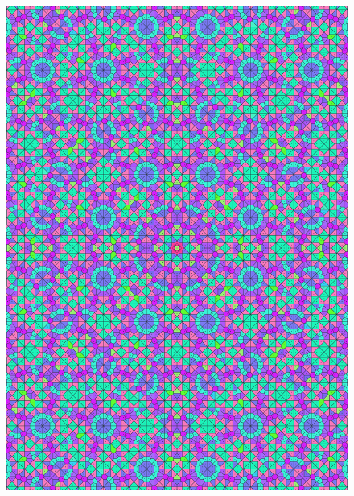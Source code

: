 \documentclass[text.tex]{subfiles}
\begin{document}
\begin{figure}[h!]
\centering
\includegraphics[width=1\textwidth]{img/results/circle8/quasi_circle_100000_(1_0alpha_1).pdf}
\end{figure}
\end{document}
